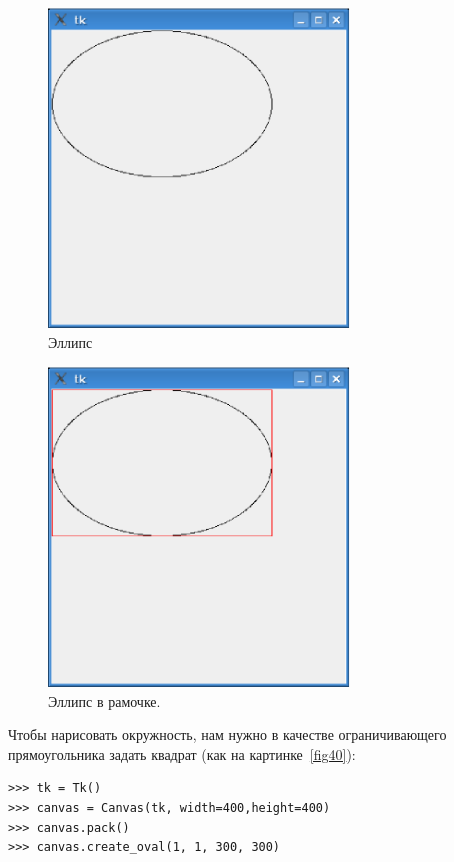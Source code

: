 \begin{figure}
\begin{center}
\includegraphics[width=80mm]{../en/figure38.eps}
\end{center}
\caption{Эллипс}\label{fig38}
\end{figure}

\begin{figure}
\begin{center}
\includegraphics[width=80mm]{../en/figure39.eps}
\end{center}
\caption{Эллипс в рамочке.}\label{fig39}
\end{figure}

Чтобы нарисовать окружность, нам нужно в качестве ограничивающего прямоугольника задать квадрат (как на картинке \ref{fig40}):

\begin{listing}
\begin{verbatim}
>>> tk = Tk()
>>> canvas = Canvas(tk, width=400,height=400)
>>> canvas.pack()
>>> canvas.create_oval(1, 1, 300, 300)
\end{verbatim}
\end{listing}

